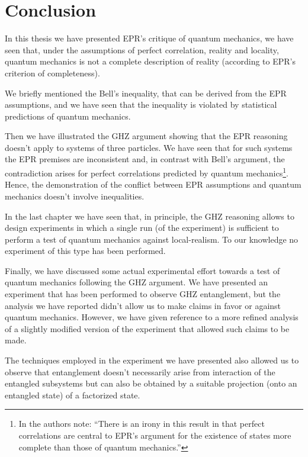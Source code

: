 \chapter*{Conclusion}
In this thesis we have presented EPR's critique of quantum mechanics, we have seen that, under the assumptions of perfect correlation, reality and locality, quantum mechanics is not a complete description of reality (according to EPR's criterion of completeness).

We briefly mentioned the Bell's inequality, that can be derived from the EPR assumptions, and we have seen that the inequality is violated by statistical predictions of quantum mechanics.

Then we have illustrated the GHZ argument showing that the EPR reasoning doesn't apply to systems of three particles. We have seen that for such systems the EPR premises are inconsistent and, in contrast with Bell's argument, the contradiction arises for perfect correlations predicted by quantum mechanics\footnote{In \cite{:/content/aapt/journal/ajp/58/12/10.1119/1.16243} the authors note: ``There is an irony in this result in that perfect correlations are central to EPR's argument for the existence of states more complete than those of quantum mechanics.''}. Hence, the demonstration of the conflict between EPR assumptions and quantum mechanics doesn't involve inequalities.

In the last chapter we have seen that, in principle, the GHZ reasoning allows to design experiments in which a single run (of the experiment) is sufficient to perform a test of quantum mechanics against local-realism. To our knowledge no experiment of this type has been performed.

Finally, we have discussed some actual experimental effort towards a test of quantum mechanics following the GHZ argument. We have presented an experiment that has been performed to observe GHZ entanglement, but the analysis we have reported didn't allow us to make claims in favor or against quantum mechanics. However, we have given reference to a more refined analysis of a slightly modified version of the experiment that allowed such claims to be made.

The techniques employed in the experiment we have presented also allowed us to observe that entanglement doesn't necessarily arise from interaction of the entangled subsystems but can also be obtained by a suitable projection (onto an entangled state) of a factorized state.
